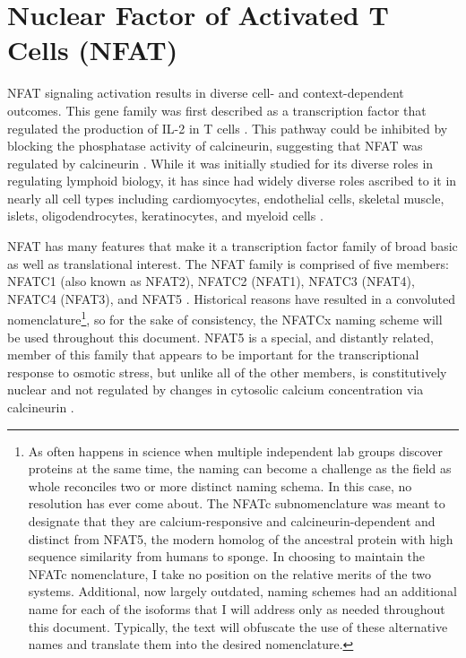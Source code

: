 \section{Nuclear Factor of Activated T Cells (NFAT)}\label{NFAT}

NFAT signaling activation results in diverse cell- and context-dependent outcomes. This gene family was first described as a transcription factor that regulated the production of IL-2 in T cells \citep{Shaw1988, Jain1993, Northrop1994}. This pathway could be inhibited by blocking the phosphatase activity of calcineurin, suggesting that NFAT was regulated by calcineurin \citep{Jain1993}. While it was initially studied for its diverse roles in regulating lymphoid biology, it has since had widely diverse roles ascribed to it in nearly all cell types including cardiomyocytes, endothelial cells, skeletal muscle, \textbeta{} islets, oligodendrocytes, keratinocytes, and myeloid cells \citep{Horsley2002, Crabtree2002, Fric2012, Ranger1998, Kegley2001, Stevenson2001, Weider2018, AlDaraji2002}. 

NFAT has many features that make it a transcription factor family of broad basic as well as translational interest. The NFAT family is comprised of five members: NFATC1 (also known as NFAT2), NFATC2 (NFAT1), NFATC3 (NFAT4), NFATC4 (NFAT3), and NFAT5 \citep{Rao1997}. Historical reasons have resulted in a convoluted nomenclature\footnote{As often happens in science when multiple independent lab groups discover proteins at the same time, the naming can become a challenge as the field as whole reconciles two or more distinct naming schema. In this case, no resolution has ever come about. The NFATc subnomenclature was meant to designate that they are calcium-responsive and calcineurin-dependent and distinct from NFAT5, the modern homolog of the ancestral protein with high sequence similarity from humans to sponge. In choosing to maintain the NFATc nomenclature, I take no position on the relative merits of the two systems. Additional, now largely outdated, naming schemes had an additional name for each of the isoforms that I will address only as needed throughout this document. Typically, the text will obfuscate the use of these alternative names and translate them into the desired nomenclature.}, so for the sake of consistency, the NFATCx naming scheme will be used throughout this document. NFAT5 is a special, and distantly related, member of this family that appears to be important for the transcriptional response to osmotic stress, but unlike all of the other members, is constitutively nuclear and not regulated by changes in cytosolic calcium concentration via calcineurin \citep{Go2004, Kumar2020}.

